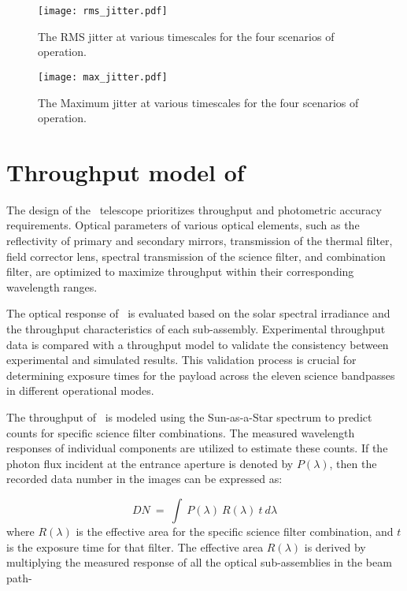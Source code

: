 \begin{figure}
    \centering
    \texttt{[image: rms\_jitter.pdf]}
    \caption{The RMS jitter at various timescales for the four scenarios of operation.}
    \label{fig:rms_jitter}
\end{figure}

\begin{figure}
    \centering
    \texttt{[image: max\_jitter.pdf]}
    \caption{The Maximum jitter at various timescales for the four scenarios of operation.}
    \label{fig:max_jitter}
\end{figure}

\section{Throughput model of {\suit}}\label{sec:suit_throughput}

The design of the \suit~telescope prioritizes throughput and photometric accuracy requirements. Optical parameters of various optical elements, such as the reflectivity of primary and secondary mirrors, transmission of the thermal filter, field corrector lens, spectral transmission of the science filter, and combination filter, are optimized to maximize throughput within their corresponding wavelength ranges.

The optical response of \suit~is evaluated based on the solar spectral irradiance and the throughput characteristics of each sub-assembly. Experimental throughput data is compared with a throughput model to validate the consistency between experimental and simulated results. This validation process is crucial for determining exposure times for the payload across the eleven science bandpasses in different operational modes.

The throughput of \suit~is modeled using the Sun-as-a-Star spectrum to predict counts for specific science filter combinations. The measured wavelength responses of individual components are utilized to estimate these counts. If the photon flux incident at the entrance aperture is denoted by $P(\lambda)$, then the recorded data number in the images can be expressed as:

 \begin{equation}\label{eq1}
     DN~=~\int~P(\lambda)~R(\lambda)~t~d\lambda
 \end{equation}
where $R(\lambda)$ is the effective area for the specific science filter combination, and $t$ is the exposure time for that filter. The effective area $R(\lambda)$ is derived by multiplying the measured response of all the optical sub-assemblies in the beam path-


